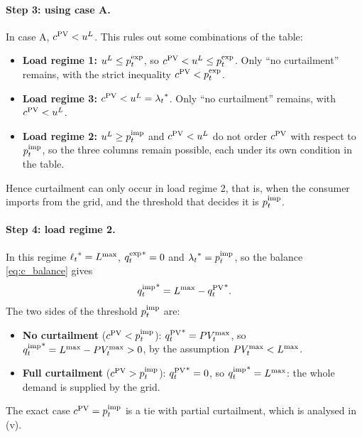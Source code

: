 \paragraph{Step 3: using case A.}
In case A, $c^{\mathrm{PV}} < u^{L}$. This rules out some combinations of the table:
\begin{itemize}
    \item \textbf{Load regime 1:} $u^{L} \leq p^{\mathrm{exp}}_{t}$, so $c^{\mathrm{PV}} < u^{L} \leq p^{\mathrm{exp}}_{t}$. Only ``no
    curtailment'' remains, with the strict inequality $c^{\mathrm{PV}} < p^{\mathrm{exp}}_{t}$.
    \item \textbf{Load regime 3:} $c^{\mathrm{PV}} < u^{L} = {\lambda_{t}}^*$. Only ``no curtailment'' remains,
    with $c^{\mathrm{PV}} < u^{L}$.
    \item \textbf{Load regime 2:} $u^{L} \geq p^{\mathrm{imp}}_{t}$ and $c^{\mathrm{PV}} < u^{L}$ do not order $c^{\mathrm{PV}}$ with
    respect to $p^{\mathrm{imp}}_{t}$, so the three columns remain possible, each under its own condition
    in the table.
\end{itemize}
Hence curtailment can only occur in load regime 2, that is, when the consumer imports from the
grid, and the threshold that decides it is $p^{\mathrm{imp}}_{t}$.

\paragraph{Step 4: load regime 2.}
In this regime ${\ell_{t}}^* = L^{\max}$, ${q^{\mathrm{exp}}_{t}}^* = 0$ and ${\lambda_{t}}^* = p^{\mathrm{imp}}_{t}$, so the balance
\eqref{eq:c_balance} gives
\begin{equation}
    {q^{\mathrm{imp}}_{t}}^* = L^{\max} - {q^{\mathrm{PV}}_{t}}^*.
\end{equation}
The two sides of the threshold $p^{\mathrm{imp}}_{t}$ are:
\begin{itemize}
    \item \textbf{No curtailment} ($c^{\mathrm{PV}} < p^{\mathrm{imp}}_{t}$): ${q^{\mathrm{PV}}_{t}}^* = PV_{t}^{\max}$, so
    ${q^{\mathrm{imp}}_{t}}^* = L^{\max} - PV_{t}^{\max} > 0$, by the assumption $PV_{t}^{\max} < L^{\max}$.
    \item \textbf{Full curtailment} ($c^{\mathrm{PV}} > p^{\mathrm{imp}}_{t}$): ${q^{\mathrm{PV}}_{t}}^* = 0$, so
    ${q^{\mathrm{imp}}_{t}}^* = L^{\max}$: the whole demand is supplied by the grid.
\end{itemize}
The exact case $c^{\mathrm{PV}} = p^{\mathrm{imp}}_{t}$ is a tie with partial curtailment, which is analysed in (v).

